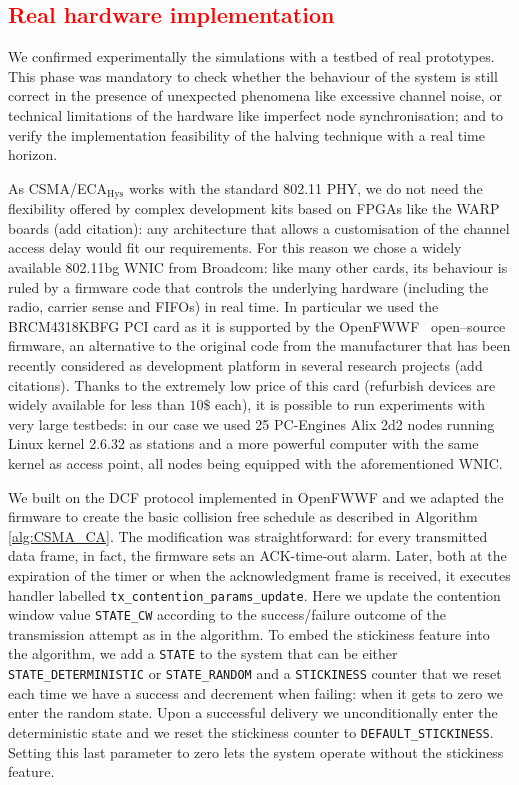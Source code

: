 \textcolor{red}{\section{Real hardware implementation}\label{EDCA}}

We confirmed experimentally the simulations with a testbed of real prototypes. This phase was mandatory to check whether the behaviour of the system is still correct in the presence of unexpected phenomena like excessive channel noise, or technical limitations of the hardware like imperfect node synchronisation; and to verify the implementation feasibility of the halving technique with a real time horizon.

As CSMA/ECA$_{\text{Hys}}$ works with the standard 802.11 PHY, we do not need the flexibility offered by complex development kits based on FPGAs like the WARP boards (add citation): any architecture that allows a customisation of the channel access delay would fit our requirements. For this reason we chose a widely available 802.11bg WNIC from Broadcom: like many other cards, its behaviour is ruled by a firmware code that controls the underlying hardware (including the radio, carrier sense and FIFOs) in real time. In particular we used the BRCM4318KBFG PCI card as it is supported by the OpenFWWF~\cite{OpenFWWF} open--source firmware, an alternative to the original code from the manufacturer that has been recently considered as development platform in several research projects (add citations). 
Thanks to the extremely low price of this card (refurbish devices are widely available for less than $10\$$ each), it is possible to run experiments with very large testbeds: in our case we used 25 PC-Engines Alix 2d2 nodes running Linux kernel 2.6.32 as stations and a more powerful computer with the same kernel as access point, all nodes being equipped with the aforementioned WNIC.

We built on the DCF protocol implemented in OpenFWWF and we adapted the firmware to create the basic collision free schedule as described in Algorithm \ref{alg:CSMA_CA}. The modification was straightforward: for every transmitted data frame, in fact, the firmware sets an ACK-time-out alarm. Later, both at the expiration of the timer or when the acknowledgment frame is received, it executes handler labelled {\tt tx\_contention\_params\_update}. Here we update the contention window value {\tt STATE\_CW} according to the success/failure outcome of the transmission attempt as in the algorithm. To embed the stickiness feature into the algorithm, we add a {\tt STATE} to the system that can be either {\tt STATE\_DETERMINISTIC} or {\tt STATE\_RANDOM} and a {\tt STICKINESS} counter that we reset each time we have a success and decrement when failing: when it gets to zero we enter the random state. Upon a successful delivery we unconditionally enter the deterministic state and we reset the stickiness counter to {\tt DEFAULT\_STICKINESS}. Setting this last parameter to zero lets the system operate without the stickiness feature.


